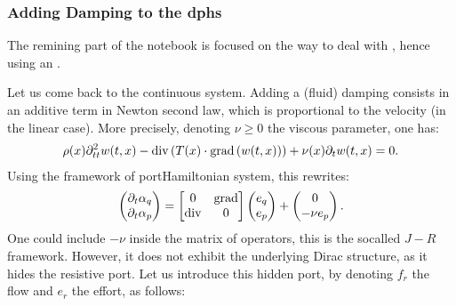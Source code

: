 \documentclass[letterpaper,10pt,english]{sphinxmanual}
\begin{document}
\noindent{}


\subsubsection{Adding Damping to the dphs}
\label{\detokenize{examples/wave:adding-damping-to-the-dphs}}
\sphinxAtStartPar
The remining part of the notebook is focused on the way to deal with
, hence using an .

\sphinxAtStartPar
Let us come back to the continuous system. Adding a (fluid) damping
consists in an additive term in Newton second law, which is proportional
to the velocity (in the linear case). More precisely, denoting
\(\nu\ge0\) the viscous parameter, one has:
\begin{equation*}
\begin{split}\rho(x) \partial_{tt}^2 w(t,x) - {\rm div} \left( T(x) \cdot {\rm grad} \left( w(t,x) \right) \right) + \nu(x) \partial_t w(t,x) = 0.\end{split}
\end{equation*}
\sphinxAtStartPar
Using the framework of port\sphinxhyphen{}Hamiltonian system, this rewrites:
\begin{equation*}
\begin{split}\begin{pmatrix} \partial_t \alpha_q \\ \partial_t \alpha_p \end{pmatrix}
=
\begin{bmatrix} 0 & {\rm grad} \\ {\rm div} & 0 \end{bmatrix}
\begin{pmatrix} e_q \\ e_p \end{pmatrix}
+
\begin{pmatrix} 0 \\ - \nu e_p \end{pmatrix}.\end{split}
\end{equation*}
\sphinxAtStartPar
One could include \(-\nu\) inside the matrix of operators, this is
the so\sphinxhyphen{}called \(J-R\) framework. However, it does not exhibit the
underlying Dirac structure, as it hides the resistive port. Let us
introduce this hidden port, by denoting \(f_r\) the flow and
\(e_r\) the effort, as follows:
\end{document}
